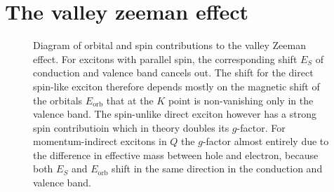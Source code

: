 \section{The valley zeeman effect}\label{zeeman}

\begin{figure}[t]
\centering
\begin{subfigure}{0.99\textwidth}
\end{subfigure}
\caption{Diagram of orbital and spin contributions to the valley Zeeman effect. For excitons with parallel spin, the corresponding shift $E_S$ of conduction and valence band cancels out. The shift for the direct spin-like exciton therefore depends mostly on the magnetic shift of the orbitals $E_{\mathrm{orb}}$ that at the $K$ point is non-vanishing only in the valence band. The spin-unlike direct exciton however has a strong spin contributioin which in theory doubles its $g$-factor. For momentum-indirect excitons in $Q$ the $g$-factor almost entirely due to the difference in effective mass between hole and electron, because both $E_S$ and $E_{\mathrm{orb}}$ shift in the same direction in the conduction and valence band.}
	\label{flakes}
\end{figure}

